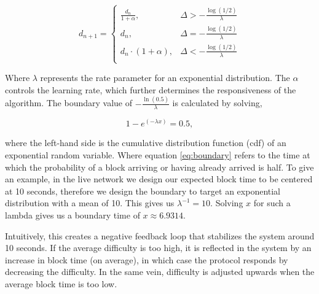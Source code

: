 \begin{equation}
    d_{n+1} = \begin{cases}
        \frac{d_n}{1+\alpha}, & \Delta > -\frac{\log(1/2)}{\lambda} \\
        d_n, & \Delta = -\frac{\log(1/2)}{\lambda} \\
        d_{n} \cdot (1 + \alpha), & \Delta < -\frac{\log(1/2)}{\lambda} \\
    \end{cases}
\end{equation}

Where $\lambda$ represents the rate parameter for an exponential distribution. The $\alpha$ controls the learning rate, which further determines the responsiveness of the algorithm. The boundary value of $-\frac{\ln (0.5)}{\lambda}$ is calculated by solving,

\begin{equation}
    \label{eq:boundary}
    1-e^{(-\lambda x)}=0.5,
\end{equation}

where the left-hand side is the cumulative distribution function (cdf) of an exponential random variable. Where equation \ref{eq:boundary} refers to the time at which the probability of a block arriving or having already arrived is half. To give an example, in the live network we design our expected block time to be centered at 10 seconds, therefore we design the boundary to target an exponential distribution with a mean of 10. This gives us $\lambda^{-1}=10$. Solving $x$ for such a lambda gives us a boundary time of $x \approx 6.9314$.

Intuitively, this creates a negative feedback loop that stabilizes the system around 10 seconds. If the average difficulty is too high, it is reflected in the system by an increase in block time (on average), in which case the protocol responds by decreasing the difficulty. In the same vein, difficulty is adjusted upwards when the average block time is too low.
